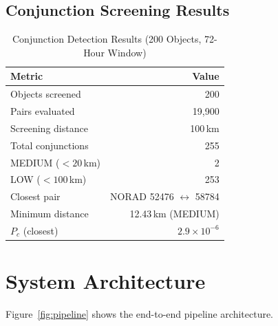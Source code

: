 \documentclass[conference]{IEEEtran}
\begin{document}
\subsection{Conjunction Screening Results}

\begin{table}[H]
\centering
\caption{Conjunction Detection Results (200 Objects, 72-Hour Window)}
\label{tab:conjunction}
\begin{tabular}{lr}
\toprule
\textbf{Metric} & \textbf{Value} \\
\midrule
Objects screened & 200 \\
Pairs evaluated  & 19{,}900 \\
Screening distance & 100\,km \\
Total conjunctions & 255 \\
\quad MEDIUM ($< 20$\,km) & 2 \\
\quad LOW ($< 100$\,km)   & 253 \\
Closest pair     & NORAD 52476 $\leftrightarrow$ 58784 \\
Minimum distance & 12.43\,km (MEDIUM) \\
$P_c$ (closest)  & $2.9 \times 10^{-6}$ \\
\bottomrule
\end{tabular}
\end{table}

\section{System Architecture}
\label{sec:system}

Figure~\ref{fig:pipeline} shows the end-to-end pipeline architecture.
\end{document}
